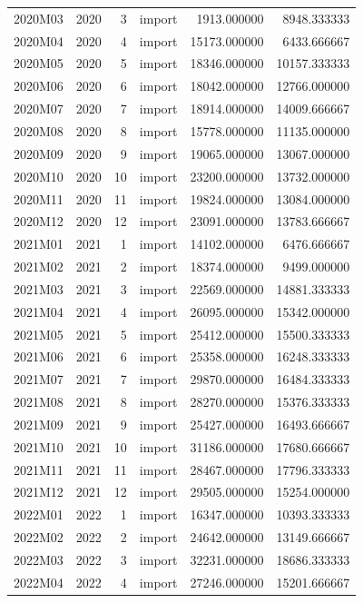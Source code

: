 \begin{tabular}{lrrlrr}
2020M03 & 2020 & 3 & import & 1913.000000 & 8948.333333 \\
2020M04 & 2020 & 4 & import & 15173.000000 & 6433.666667 \\
2020M05 & 2020 & 5 & import & 18346.000000 & 10157.333333 \\
2020M06 & 2020 & 6 & import & 18042.000000 & 12766.000000 \\
2020M07 & 2020 & 7 & import & 18914.000000 & 14009.666667 \\
2020M08 & 2020 & 8 & import & 15778.000000 & 11135.000000 \\
2020M09 & 2020 & 9 & import & 19065.000000 & 13067.000000 \\
2020M10 & 2020 & 10 & import & 23200.000000 & 13732.000000 \\
2020M11 & 2020 & 11 & import & 19824.000000 & 13084.000000 \\
2020M12 & 2020 & 12 & import & 23091.000000 & 13783.666667 \\
2021M01 & 2021 & 1 & import & 14102.000000 & 6476.666667 \\
2021M02 & 2021 & 2 & import & 18374.000000 & 9499.000000 \\
2021M03 & 2021 & 3 & import & 22569.000000 & 14881.333333 \\
2021M04 & 2021 & 4 & import & 26095.000000 & 15342.000000 \\
2021M05 & 2021 & 5 & import & 25412.000000 & 15500.333333 \\
2021M06 & 2021 & 6 & import & 25358.000000 & 16248.333333 \\
2021M07 & 2021 & 7 & import & 29870.000000 & 16484.333333 \\
2021M08 & 2021 & 8 & import & 28270.000000 & 15376.333333 \\
2021M09 & 2021 & 9 & import & 25427.000000 & 16493.666667 \\
2021M10 & 2021 & 10 & import & 31186.000000 & 17680.666667 \\
2021M11 & 2021 & 11 & import & 28467.000000 & 17796.333333 \\
2021M12 & 2021 & 12 & import & 29505.000000 & 15254.000000 \\
2022M01 & 2022 & 1 & import & 16347.000000 & 10393.333333 \\
2022M02 & 2022 & 2 & import & 24642.000000 & 13149.666667 \\
2022M03 & 2022 & 3 & import & 32231.000000 & 18686.333333 \\
2022M04 & 2022 & 4 & import & 27246.000000 & 15201.666667 \\

\end{tabular}
